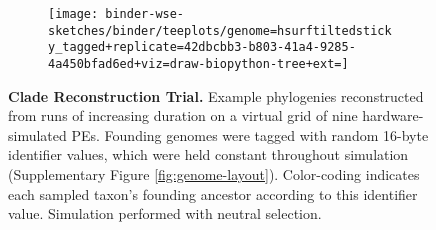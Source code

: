 \begin{figure}
\begin{subfigure}[c]{\linewidth} \centering
  \begin{minipage}[c]{0.08\linewidth} \flushright
    \caption{}
    \label{fig:tagged_250}
  \end{minipage}%
  \begin{minipage}[c]{0.92\linewidth}
    \texttt{[image: binder-wse-sketches/binder/teeplots/genome=hsurftiltedsticky\_tagged+replicate=42dbcbb3-b803-41a4-9285-4a450bfad6ed+viz=draw-biopython-tree+ext=]}
  \end{minipage}%
\end{subfigure}

\vspace{-2ex}

\caption{%
\textbf{Clade Reconstruction Trial.}
\footnotesize
Example phylogenies reconstructed from runs of increasing duration on a virtual grid of nine hardware-simulated PEs.
Founding genomes were tagged with random 16-byte identifier values, which were held constant throughout simulation (Supplementary Figure \ref{fig:genome-layout}).
Color-coding indicates each sampled taxon's founding ancestor according to this identifier value.
Simulation performed with neutral selection.
}
\label{fig:tagged}
\vspace{-0.2in}
\end{figure}
